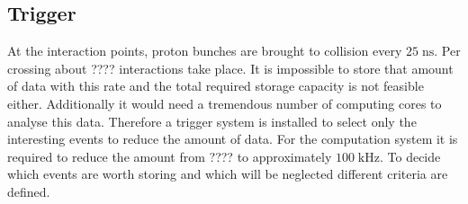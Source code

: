 \subsection{Trigger}
\label{sec:trigger}
	At the interaction points, proton bunches are brought to collision every $25\;\text{ns}$. Per crossing about ????
	interactions take place. It is impossible to store that amount of data with this rate and the total required storage capacity is not feasible either. Additionally it would need a tremendous number of computing cores to analyse this data. Therefore a trigger system is installed to select only the interesting events to reduce the amount of data. For the computation system it is required to reduce the amount from ???? to approximately $100\;\text{kHz}$.
 	To decide which events are worth storing and which will be neglected different criteria are defined.
	
	